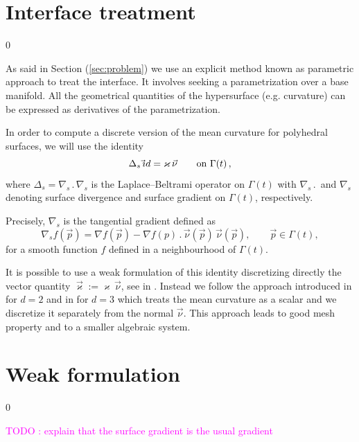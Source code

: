\documentclass[a4paper,12pt,onecolumn]{article}
\newcommand{\nabs}{\nabla_{\!s}}
\newcommand{\id}{\rm id}
\begin{document}
\section{Interface treatment}
\setcounter{equation} 0

As said in Section (\ref{sec:problem}) we use an explicit method known as parametric approach to treat the interface. It involves seeking a parametrization over a base manifold. All the geometrical quantities of the hypersurface (e.g. curvature) can be expressed as derivatives of the parametrization.

In order to compute a discrete version of the mean curvature for polyhedral surfaces, we will use the identity
\begin{equation} \label{eq:LBop}
\Delta_s\, \vec \id = \varkappa\, \vec\nu \qquad \mbox{on $\Gamma(t)$}\,,
\end{equation}
where $\Delta_s = \nabs\,.\,\nabs$ is the Laplace--Beltrami operator on $\Gamma(t)$ with $\nabs\,.\,$ and $\nabs$ denoting surface divergence and surface gradient on $\Gamma(t)$, respectively. 

Precisely, $\nabla_s$ is the tangential gradient defined as
\begin{equation}\label{eq:tangent_gradient}
 \nabla_s f(\vec{p})=\nabla f(\vec{p})-\nabla f(p)\,.\,\vec{\nu}(\vec{p})\,\vec{\nu}(\vec{p}),\qquad \vec{p}\in\Gamma(t),
\end{equation}
for a smooth function $f$ defined in a neighbourhood of $\Gamma(t)$. 

It is possible to use a weak formulation of this identity discretizing directly the vector quantity $\vec\varkappa:=\varkappa\,\vec\nu$, see in \cite{Dziuk91,Bansch01,GanesanMT07}. Instead we follow the approach introduced in \cite{triplej} for $d=2$ and in \cite{gflows3d} for
$d=3$ which treats the mean curvature as a scalar and we discretize it separately from the normal $\vec\nu$. This approach leads to good mesh property and to a smaller algebraic system.

\section{Weak formulation}\label{sec:weak_formulation}
\setcounter{equation} 0

\textcolor{magenta}{TODO : explain that the surface gradient is the usual gradient}
\end{document}

